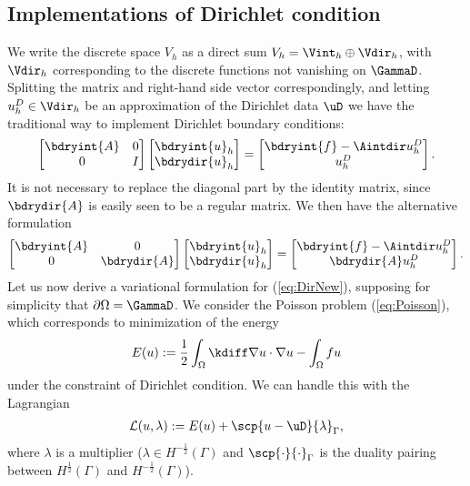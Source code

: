 \subsection{Implementations of Dirichlet condition}\label{subsec:PoissonP1Dirichlet}
%
We write the discrete space $V_h$ as a direct sum $V_h = \Vint_h \oplus \Vdir_h$, with $\Vdir_h$ corresponding to the discrete functions not vanishing on $\GammaD$. 
Splitting the matrix and right-hand side vector correspondingly, and letting $u^D_h\in \Vdir_h$ be an approximation of the Dirichlet data $\uD$ we have the traditional way to implement Dirichlet boundary conditions:
%
\begin{equation}\label{eq:DirTrad}
\begin{bmatrix}
\bdryint{A} & 0\\
0 & I
\end{bmatrix}
\begin{bmatrix}
\bdryint{u}_h\\
\bdrydir{u}_h
\end{bmatrix}
=
\begin{bmatrix}
\bdryint{f} - \Aintdir u^D_h\\
u^D_h
\end{bmatrix}.
\end{equation}
%
It is not necessary to replace the diagonal part by the identity matrix, since $\bdrydir{A}$ is easily seen to be a regular matrix. We then have the alternative formulation   
%
\begin{equation}\label{eq:DirNew}
\begin{bmatrix}
\bdryint{A} & 0\\
0 & \bdrydir{A}
\end{bmatrix}
\begin{bmatrix}
\bdryint{u}_h\\
\bdrydir{u}_h
\end{bmatrix}
=
\begin{bmatrix}
\bdryint{f} - \Aintdir u^D_h\\
\bdrydir{A}u^D_h
\end{bmatrix}.
\end{equation}
%
Let us now derive a variational formulation for (\ref{eq:DirNew}), supposing for simplicity that $\partial\Omega=\GammaD$. We consider the Poisson problem (\ref{eq:Poisson}), which corresponds to minimization of
the energy
%
\begin{align*}
E(u) := \frac12\int_{\Omega}\kdiff\nabla u\cdot\nabla u-\int_{\Omega}fu
\end{align*}
%
under the constraint of Dirichlet condition. We can handle this with the Lagrangian
%
\begin{align*}
\mathcal L(u,\lambda) := E(u) + \scp{u-\uD}{\lambda}_{\Gamma}, 
\end{align*}
%
where $\lambda$ is a multiplier ($\lambda\in H^{-\frac12}(\Gamma)$ and $\scp{\cdot}{\cdot}_{\Gamma}$ is the duality pairing between $H^{\frac12}(\Gamma)$ and $H^{-\frac12}(\Gamma)$).

